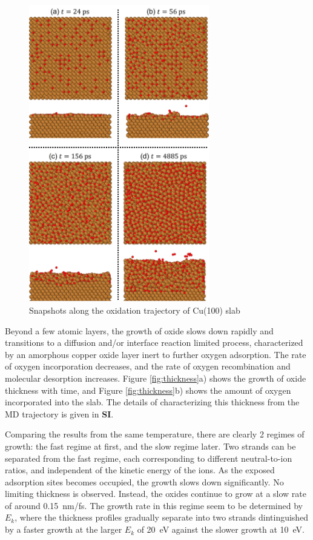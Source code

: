 \documentclass[manuscript=cmatex]{achemso}
\begin{document}
\begin{figure}[h]
  \centering
  \includegraphics[width=0.7\textwidth]{traj100}
  \caption[Snapshots along the oxidation trajectory of Cu(100) slab]{Snapshots along the oxidation trajectory of Cu(100) slab}
  \label{fig:traj}
\end{figure}
Beyond a few atomic layers, the growth of oxide slows down rapidly and transitions to a diffusion and/or interface reaction limited process, characterized by an amorphous copper oxide layer inert to further oxygen adsorption. The rate of oxygen incorporation decreases, and the rate of oxygen recombination and molecular desorption increases. Figure \ref{fig:thickness}a) shows the growth of oxide thickness with time, and Figure \ref{fig:thickness}b) shows the amount of oxygen incorporated into the slab. The details of characterizing this thickness from the MD trajectory is given in \textbf{SI}.

Comparing the results from the same temperature, there are clearly 2 regimes of growth: the fast regime at first, and the slow regime later. Two strands can be separated from the fast regime, each corresponding to different neutral-to-ion ratios, and independent of the kinetic energy of the ions. As the exposed adsorption sites becomes occupied, the growth slows down significantly. No limiting thickness is observed. Instead, the oxides continue to grow at a slow rate of around \SI{0.15}{nm/fs}. The growth rate in this regime seem to be determined by $E_k$, where the thickness profiles gradually separate into two strands dintinguished by a faster growth at the larger $E_k$ of \SI{20}{eV} against the slower growth at \SI{10}{eV}.
\end{document}
